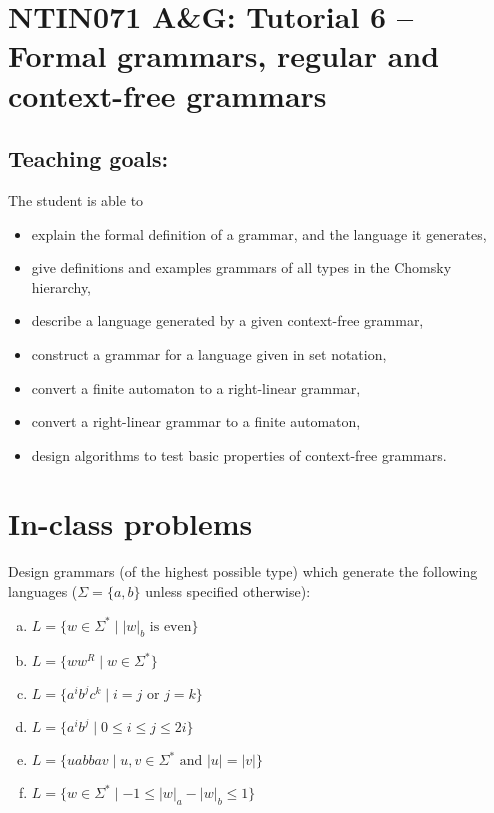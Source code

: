 \documentclass[a4paper,12pt]{amsart}
\begin{document}
\thispagestyle{empty}

\section*{NTIN071 A\&G: Tutorial 6 -- Formal grammars, regular and context-free grammars}

\medskip

\subsection*{Teaching goals:} The student is able to

    \begin{itemize}\setlength{\itemsep}{0pt}
        \item explain the formal definition of a grammar, and the language it generates,
        \item give definitions and examples grammars of all types in the Chomsky hierarchy,
        \item describe a language generated by a given context-free grammar,
        \item construct a grammar for a language given in set notation,
        \item convert a finite automaton to a right-linear grammar,
        \item convert a right-linear grammar to a finite automaton,
        \item design algorithms to test basic properties of context-free grammars.
    \end{itemize}


\section*{In-class problems}


\medskip\begin{problem}

    Design grammars (of the highest possible type) which generate the following languages ($\Sigma=\{a,b\}$ unless specified otherwise):
    
    \vspace{-3pt}
    \begin{multicols}{2}
    \begin{enumerate}[(a)]
        \item $L=\{w\in\Sigma^*\mid |w|_b\text{ is even}\} $
        \item $L=\{ww^R\mid w\in \Sigma^*\}$        
        \item $L = \{a^ib^jc^k\mid i = j\text{ or }j = k\}$        
        \item $L=\{a^i b^j\mid 0\leq i\leq j\leq 2i\}$
        \item $L=\{uabbav\mid u,v\in\Sigma^*\text{ and }|u|=|v|\}$
        \item $L=\{w\in \Sigma^*\mid -1\leq |w|_a-|w|_b\leq 1\}$        
    \end{enumerate}
    \end{multicols}

\end{problem}
\end{document}
